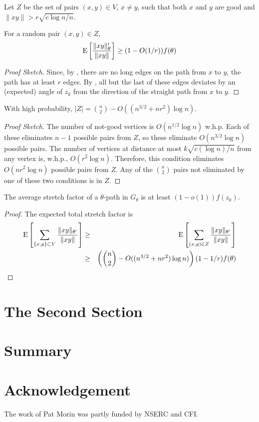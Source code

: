\documentclass{patmorin}
\begin{document}
Let $Z$ be the set of pairs $(x,y)\in V$, $x\neq y$, such that both $x$ and $y$ are good and $\|xy\| > r\sqrt{c\log n/n}$. 

\begin{lem}
  For a random pair $(x,y)\in Z$,
  \[ 
    \mathrm{E}\left[\frac{\|xy\|_\theta'}{\|xy\|}\right] \ge (1-O(1/r))f(\theta)
  \]
\end{lem}

\begin{proof}[Proof Sketch]
  Since, by , there are no long edges on the path
  from $x$ to $y$, the path has at least $r$ edges.  By ,
  all but the last of these edges deviates by an (expected) angle of $z_k$
  from the direction of the straight path from $x$ to $y$.
\end{proof}


\begin{lem}
   With high probability, $|Z| = \binom{n}{2}-O((n^{3/2}+nr^2)\log n)$.
\end{lem}

\begin{proof}[Proof Sketch]
  The number of not-good vertices is $O(n^{1/2}\log n)$ w.h.p.  Each of
  these eliminates $n-1$ possible pairs from $Z$, so these eliminate
  $O(n^{3/2}\log n)$ possible pairs.   The number of vertices at
  distance at most $k\sqrt{c(\log n)/n}$ from any vertex is, w.h.p.,
  $O(r^2\log n)$.  Therefore, this condition eliminates $O(nr^2\log n)$
  possible pairs from $Z$.  Any of the $\binom{n}{2}$ pairs not eliminated
  by one of these two conditions is in $Z$.
\end{proof}

\begin{thm}
  The average stretch factor of a $\theta$-path in $G_\theta$ is
  at least $(1-o(1))f(z_k)$.
\end{thm}

\begin{proof}
   The expected total stretch factor is
  \begin{eqnarray*}
  \mathrm{E}\left[\sum_{\{x,y\} \subset V} \frac{\|xy\|_{\theta'}}{\|xy\|}\right]
  & \ge & \mathrm{E}\left[\sum_{(x,y)\in Z} \frac{\|xy\|_{\theta'}}{\|xy\|}\right] \\
  & \ge & \left(\binom{n}{2}-O((n^{3/2}+nr^2)\log n)\right)(1-1/r)f(\theta) \\
  \end{eqnarray*}
\end{proof}

\section{The Second Section}

\section{Summary}

\section*{Acknowledgement}

The work of Pat Morin was partly funded by NSERC and CFI.



\end{document}
